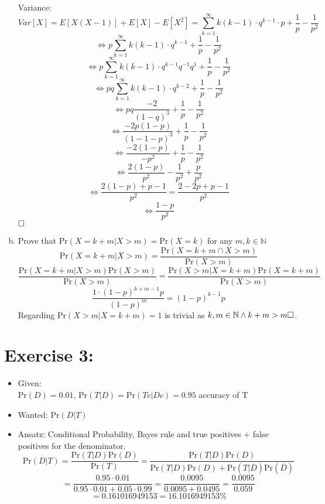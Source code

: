 \documentclass[a4paper]{article}
\begin{document}
\begin{enumerate}[a.]
                Variance: 
                \[ Var[X] =  E[X(X-1)] + E[X] - E[X^2] = \sum_{k=1}^{\infty} k(k-1) \cdot q^{k-1} \cdot p + \frac{1}{p}- \frac{1}{p^2} \]
                \[ \Leftrightarrow p \sum_{k=1}^{\infty} k(k-1) \cdot q^{k-1} + \frac{1}{p}- \frac{1}{p^2} \]
                \[ \Leftrightarrow p \sum_{k=1}^{\infty} k(k-1) \cdot q^{k-1}q^{-1} q^1+ \frac{1}{p}- \frac{1}{p^2}  \]
                 \[ \Leftrightarrow pq \sum_{k=1}^{\infty} k(k-1) \cdot q^{k-2} + \frac{1}{p}- \frac{1}{p^2}  \]
                  \[ \Leftrightarrow pq \frac{-2}{(1-q)^3} + \frac{1}{p}- \frac{1}{p^2}  \]
                   \[ \Leftrightarrow  \frac{-2p(1-p)}{(1-1-p)^3} + \frac{1}{p}- \frac{1}{p^2}  \]
                   \[ \Leftrightarrow  \frac{-2(1-p)}{-p^2} + \frac{1}{p}- \frac{1}{p^2}  \]
                    \[ \Leftrightarrow  \frac{2(1-p)}{p^2} - \frac{1}{p^2} + \frac{p}{p^2}  \]
                    \[ \Leftrightarrow  \frac{2(1-p) + p - 1}{p^2} = \frac{ 2- 2p + p - 1}{p^2} \]
                    \[ \Leftrightarrow \frac{ 1- p}{p^2}\] $\hfill \square$ \\ 
            \item Prove that Pr$(X = k+m | X > m) = $Pr$(X = k)$ for any $m,k \in \mathbb{N}$ \\
                \[ \text{Pr}(X = k + m|X > m) = \frac{\text{Pr}(X = k + m \cap X > m)}{\text{Pr}(X > m)} \]
                 \[  \frac{\text{Pr}(X = k + m | X > m)\text{Pr}( X > m)}{\text{Pr}(X > m)} = \frac{\text{Pr}(X > m | X = k + m)\text{Pr}(X = k + m)}{\text{Pr}(X > m)}  \]
                \[ \frac{ 1 \cdot (1-p)^{k+m-1} p}{(1-p)^m} = (1-p)^{k-1} p \]
                Regarding $\text{Pr}( X > m| X = k +m ) = 1$ is trivial as $k, m \in \mathbb{N} \wedge k+m > m \hfill \square$.
                
        \end{enumerate}
    \newpage
    
	\section*{Exercise 3: }\label{sec:exercise3}
    \begin{itemize}
        \item Given: \\
            $\text{Pr}(D) = 0.01$, $\text{Pr}(T|D) = \text{Pr}(Tc|Dc) = 0.95$ accuracy of T 
            \item Wanted: $\text{Pr}(D|T)$
            \item Ansatz:  Conditional Probability, Bayes rule and true positives + false positives for the denominator. \\
            \[ \text{Pr}(D|T) = \frac{\text{Pr}(T|D) \text{Pr}(D)}{\text{Pr}(T)} = \frac{\text{Pr}(T|D) \text{Pr}(D)}{\text{Pr}(T|D) \text{Pr}(D) + \text{Pr}(T|\overline{D}) \text{Pr}(\overline{D})} \]
            \[ = \frac{0.95 \cdot 0.01}{0.95 \cdot 0.01 + 0.05 \cdot 0.99} = \frac{0.0095}{0.0095 + 0.0495} =  \frac{0.0095}{0.059} \] 
            \[ = 0.161016949153 = 16.1016949153\% \]
    \end{itemize}
\end{document}
